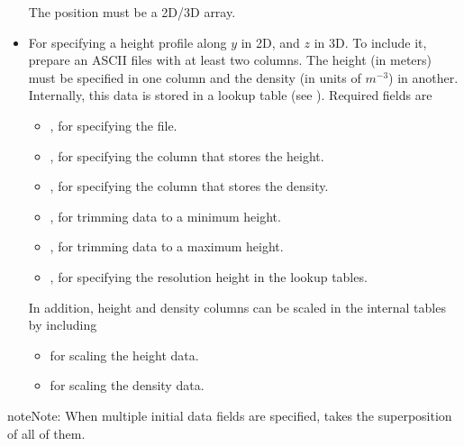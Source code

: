 \documentclass[letterpaper,10pt,english]{sphinxmanual}
\begin{document}
\begin{itemize}
The position must be a 2D/3D array.

\item {} 
 For specifying a height profile along \(y\) in 2D, and \(z\) in 3D.
To include it, prepare an ASCII files with at least two columns.
The height (in meters) must be specified in one column and the density (in units of \(m^{-3}\)) in another.
Internally, this data is stored in a lookup table (see {\hyperref[\detokenize{Utilities/LookupTable:chap-lookuptable}]{}}).
Required fields are
\begin{itemize}
\item {} 
 , for specifying the file.

\item {} 
, for specifying the column that stores the height.

\item {} 
, for specifying the column that stores the density.

\item {} 
, for trimming data to a minimum height.

\item {} 
, for trimming data to a maximum height.

\item {} 
, for specifying the resolution height in the  lookup tables.

\end{itemize}

In addition, height and density columns can be scaled in the internal tables by including
\begin{itemize}
\item {} 
 for scaling the height data.

\item {} 
 for scaling the density data.

\end{itemize}

\end{itemize}

\begin{sphinxadmonition}{note}{Note:}
When multiple initial data fields are specified,  takes the superposition of all of them.
\end{sphinxadmonition}
\end{document}
